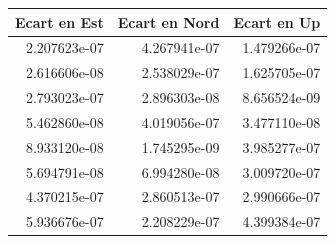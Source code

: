 \begin{tabular}{rrr}
\toprule
Ecart en Est & Ecart en Nord &  Ecart en Up \\
\midrule
2.207623e-07 &  4.267941e-07 & 1.479266e-07 \\
2.616606e-08 &  2.538029e-07 & 1.625705e-07 \\
2.793023e-07 &  2.896303e-08 & 8.656524e-09 \\
5.462860e-08 &  4.019056e-07 & 3.477110e-08 \\
8.933120e-08 &  1.745295e-09 & 3.985277e-07 \\
5.694791e-08 &  6.994280e-08 & 3.009720e-07 \\
4.370215e-07 &  2.860513e-07 & 2.990666e-07 \\
5.936676e-07 &  2.208229e-07 & 4.399384e-07 \\
\bottomrule
\end{tabular}
